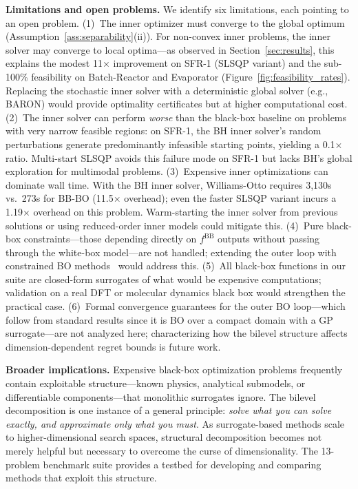 \documentclass[12pt,a4paper]{article}%
\theoremstyle{plain}%
\theoremstyle{remark}%
\theoremstyle{definition}%
\def\BB{\mathrm{BB}}
\begin{document}
\noindent\textbf{Limitations and open problems.}
We identify six limitations, each pointing to an open problem. (1)~The inner optimizer must converge to the global optimum (Assumption~\ref{ass:separability}(ii)). For non-convex inner problems, the inner solver may converge to local optima---as observed in Section~\ref{sec:results}, this explains the modest 11$\times$ improvement on SFR-1 (SLSQP variant) and the sub-100\% feasibility on Batch-Reactor and Evaporator (Figure~\ref{fig:feasibility_rates}). Replacing the stochastic inner solver with a deterministic global solver (e.g., BARON) would provide optimality certificates but at higher computational cost. (2)~The inner solver can perform \emph{worse} than the black-box baseline on problems with very narrow feasible regions: on SFR-1, the BH inner solver's random perturbations generate predominantly infeasible starting points, yielding a 0.1$\times$ ratio. Multi-start SLSQP avoids this failure mode on SFR-1 but lacks BH's global exploration for multimodal problems. (3)~Expensive inner optimizations can dominate wall time. With the BH inner solver, Williams-Otto requires 3{,}130s vs.\ 273s for BB-BO (11.5$\times$ overhead); even the faster SLSQP variant incurs a 1.19$\times$ overhead on this problem. Warm-starting the inner solver from previous solutions or using reduced-order inner models could mitigate this. (4)~Pure black-box constraints---those depending directly on $f^{\BB}$ outputs without passing through the white-box model---are not handled; extending the outer loop with constrained BO methods~\cite{gardner2014,gelbart2014unknown} would address this. (5)~All black-box functions in our suite are closed-form surrogates of what would be expensive computations; validation on a real DFT or molecular dynamics black box would strengthen the practical case. (6)~Formal convergence guarantees for the outer BO loop---which follow from standard results since it is BO over a compact domain with a GP surrogate---are not analyzed here; characterizing how the bilevel structure affects dimension-dependent regret bounds is future work.

\noindent\textbf{Broader implications.}
Expensive black-box optimization problems frequently contain exploitable structure---known physics, analytical submodels, or differentiable components---that monolithic surrogates ignore. The bilevel decomposition is one instance of a general principle: \emph{solve what you can solve exactly, and approximate only what you must}. As surrogate-based methods scale to higher-dimensional search spaces, structural decomposition becomes not merely helpful but necessary to overcome the curse of dimensionality. The 13-problem benchmark suite provides a testbed for developing and comparing methods that exploit this structure.
\end{document}
